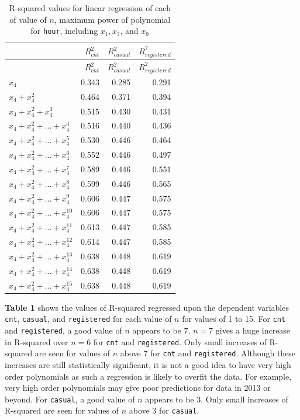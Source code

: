 \documentclass[
]{article}
\begin{document}
\begin{longtable}[]{@{}lrrr@{}}
\caption{R-squared values for linear regression of each of value of
\(n\), maximum power of polynomial for \texttt{hour}, including
\(x_{1}, x_{2}\), and \(x_{9}\)}\tabularnewline
\toprule
& \(R^{2}_{cnt}\) & \(R^{2}_{casual}\) &
\(R^{2}_{registered}\)\tabularnewline
\midrule
\endfirsthead
\toprule
& \(R^{2}_{cnt}\) & \(R^{2}_{casual}\) &
\(R^{2}_{registered}\)\tabularnewline
\midrule
\endhead
\(x_{4}\) & 0.343 & 0.285 & 0.291\tabularnewline
\(x_{4}+x_{4}^{2}\) & 0.464 & 0.371 & 0.394\tabularnewline
\(x_{4}+x_{4}^{2}+x_{4}^{3}\) & 0.515 & 0.430 & 0.431\tabularnewline
\(x_{4}+x_{4}^{2}+\dots+x_{4}^{4}\) & 0.516 & 0.440 &
0.436\tabularnewline
\(x_{4}+x_{4}^{2}+\dots+x_{4}^{5}\) & 0.530 & 0.446 &
0.464\tabularnewline
\(x_{4}+x_{4}^{2}+\dots+x_{4}^{6}\) & 0.552 & 0.446 &
0.497\tabularnewline
\(x_{4}+x_{4}^{2}+\dots+x_{4}^{7}\) & 0.589 & 0.446 &
0.551\tabularnewline
\(x_{4}+x_{4}^{2}+\dots+x_{4}^{8}\) & 0.599 & 0.446 &
0.565\tabularnewline
\(x_{4}+x_{4}^{2}+\dots+x_{4}^{9}\) & 0.606 & 0.447 &
0.575\tabularnewline
\(x_{4}+x_{4}^{2}+\dots+x_{4}^{10}\) & 0.606 & 0.447 &
0.575\tabularnewline
\(x_{4}+x_{4}^{2}+\dots+x_{4}^{11}\) & 0.613 & 0.447 &
0.585\tabularnewline
\(x_{4}+x_{4}^{2}+\dots+x_{4}^{12}\) & 0.614 & 0.447 &
0.585\tabularnewline
\(x_{4}+x_{4}^{2}+\dots+x_{4}^{13}\) & 0.638 & 0.448 &
0.619\tabularnewline
\(x_{4}+x_{4}^{2}+\dots+x_{4}^{14}\) & 0.638 & 0.448 &
0.619\tabularnewline
\(x_{4}+x_{4}^{2}+\dots+x_{4}^{15}\) & 0.638 & 0.448 &
0.619\tabularnewline
\bottomrule
\end{longtable}

\textbf{Table 1} shows the values of R-squared regressed upon the
dependent variables \texttt{cnt}, \texttt{casual}, and
\texttt{registered} for each value of \(n\) for values of 1 to 15. For
\texttt{cnt} and \texttt{registered}, a good value of \(n\) appears to
be 7. \(n = 7\) gives a huge increase in R-squared over \(n = 6\) for
\texttt{cnt} and \texttt{registered}. Only small increases of R-squared
are seen for values of \(n\) above 7 for \texttt{cnt} and
\texttt{registered}. Although these increases are still statistically
significant, it is not a good idea to have very high order polynomials
as such a regression is likely to overfit the data. For example, very
high order polynomials may give poor predictions for data in 2013 or
beyond. For \texttt{casual}, a good value of \(n\) appears to be 3. Only
small increases of R-squared are seen for values of \(n\) above 3 for
\texttt{casual}.
\end{document}
